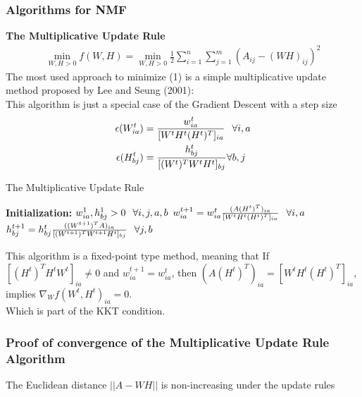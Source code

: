 \documentclass[aspectratio=169]{beamer}
\begin{document}
\begin{spacing}{1.0}
\begin{frame}
\frametitle{Algorithms for NMF}
\textbf{The Multiplicative Update Rule}
\begin{align}
    \min_{W,H>0}f(W,H) = \min_{W,H>0} \frac{1}{2}\sum_{i = 1}^{n}\sum_{j= 1}^{m} (A_{ij} - (WH)_{ij})^{2} \label{op}
\end{align}
The most used approach to minimize (1) is a simple multiplicative update method
proposed by Lee and Seung (2001):\\
This algorithm is just a special case of the Gradient Descent with a step size 
\begin{align*}
    \epsilon(W_{ia}^{t}) &= \frac{w^{t}_{ia}}{[W^{t}H^{t}(H^{t})^{T}]_{ia}}\hspace{0.1in} \forall i,a\\
    \epsilon(H_{bj}^{t}) &= \frac{h^{t}_{bj}}{[(W^{t})^{T}W^{t}H^{t}]_{bj}}\forall b,j  
\end{align*}
\end{frame}
\begin{frame}
\begin{algorithm}[H]
    \caption{The Multiplicative Update Rule}
     \textbf{Initialization:} $w_{ia}^{1}, h_{bj}^{1} > 0 \hspace{0.1in}\forall i,j,a,b$\;
     {
    $w_{ia}^{t+1} = w_{ia}^{t}\frac{(A(H^{t})^{T})_{ia}}{[W^{t}H^{t}(H^{t})^{T}]_{ia}} \hspace{0.1in}\forall i,a$\;
    $h_{bj}^{t+1} = h_{bj}^{t}\frac{((W^{t+1})^{T}A)_{ia}}{[(W^{t+1})^{T}W^{t+1}H^{t}]_{bj}} \hspace{0.1in}\forall j,b$\;}
    \end{algorithm}
\end{frame}
\begin{frame}
        This algorithm is a fixed-point type method, meaning that If $[(H^{t})^{T}H^{t}W^{t}]_{ia} \neq 0$ and
        $w_{ia}^{t+1} = w_{ia}^{t}$, then $(A(H^{t})^{T})_{ia} = [W^{t}H^{t}(H^{t})^{T}]_{ia}$, implies 
        $\nabla_{W}f(W^{t}, H^{t})_{ia} = 0$.\\
        Which is part of the KKT condition.
\end{frame}
\begin{frame}
    \frametitle{Proof of convergence of the Multiplicative Update Rule Algorithm}
    \begin{theorem}
        The Euclidean distance $||A - WH||$ is non-increasing under the update rules
        \begin{align*}

\end{align*}
\end{theorem}
\end{frame}
\end{spacing}
\end{document}
